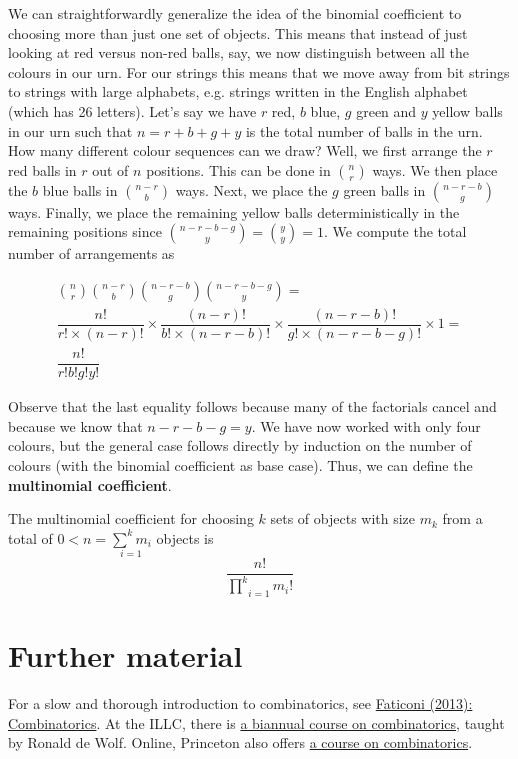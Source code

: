 We can straightforwardly generalize the idea of the binomial coefficient to choosing more than just one set of objects. This means that instead of just
looking at red versus non-red balls, say, we now distinguish between all the colours in our urn. For our strings this means that we move away from
bit strings to strings with large alphabets, e.g. strings written in the English alphabet (which has 26 letters). Let's say we have $ r $ red, 
$ b $ blue, $ g $ green and $ y $ yellow balls in our urn such that $ n = r+b+g+y $ is the total number of balls in the urn. How many different
colour sequences can we draw? Well, we first arrange the $ r $ red balls in $ r $ out of $ n $ positions. This can be done in 
$ \binom{n}{r} $ ways. We then place the $ b $ blue balls in $ \binom{n-r}{b} $ ways. Next, we place the $ g $ green balls in $ \binom{n-r-b}{g} $
ways. Finally, we place the remaining yellow balls deterministically in the remaining positions since $ \binom{n-r-b-g}{y} = \binom{y}{y} = 1  $.
We compute the total number of arrangements as

\begin{gather}
\binom{n}{r} \binom{n-r}{b} \binom{n-r-b}{g} \binom{n-r-b-g}{y} = \\
\dfrac{n!}{r!\times (n-r)!} \times \dfrac{(n-r)!}{b!\times (n-r-b)!} \times \dfrac{(n-r-b)!}{g! \times (n-r-b-g)!} \times 1 = \\
\dfrac{n!}{r!b!g!y!}
\end{gather}

Observe that the last equality follows because many of the factorials cancel and because we know that $ n-r-b-g = y $. We have now worked with
only four colours, but the general case follows directly by induction on the number of colours (with the binomial coefficient as base case). 
Thus, we can define the \textbf{multinomial coefficient}.

\begin{Definition}
The multinomial coefficient for choosing $ k $ sets of objects with size $ m_{k} $ from a total of $ 0 < n = \underset{i=1}{\overset{k}{\sum}m_{i}} $ 
objects is $$ \dfrac{n!}{\underset{i=1}{\overset{k}{\prod}}m_{i}!} $$
\end{Definition}

\section*{Further material}
For a slow and thorough introduction to combinatorics, see \href{http://eu.wiley.com/WileyCDA/WileyTitle/productCd-111840436X.html}{Faticoni (2013): 
Combinatorics}. At the ILLC, there is \href{http://homepages.cwi.nl/~rdewolf/combinatorics14.html}{a biannual course on combinatorics}, 
taught by Ronald de Wolf. Online, Princeton also offers \href{https://www.coursera.org/course/ac}{a course on combinatorics}.
